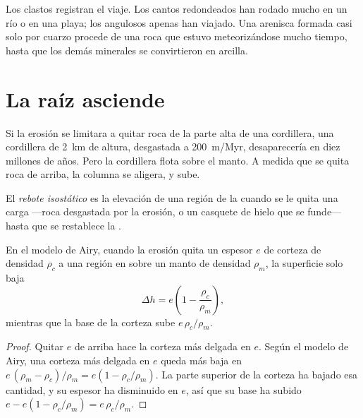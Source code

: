Los clastos registran el viaje. Los cantos redondeados han rodado mucho en un
río o en una playa; los angulosos apenas han viajado. Una arenisca formada
casi solo por cuarzo procede de una roca que estuvo meteorizándose mucho
tiempo, hasta que los demás minerales se convirtieron en arcilla.

\section{La raíz asciende}

Si la erosión se limitara a quitar roca de la parte alta de una cordillera,
una cordillera de \qty{2}{km} de altura, desgastada a \qty{200}{m/Myr},
desaparecería en diez millones de años. Pero la cordillera flota sobre el
manto. A medida que se quita roca de arriba, la columna se aligera, y sube.

\begin{definition}\label{def:g12:destruction-of-mountains:rebound}
El \emph{rebote isostático} es la
elevación de una región de la  cuando se le quita una carga ---roca
desgastada por la erosión, o un casquete de hielo que se funde--- hasta que se
restablece la .
\end{definition}

\begin{proposition}\label{prop:g12:destruction-of-mountains:rebound}
En el modelo de Airy, cuando la erosión quita un espesor $e$ de corteza de
densidad $\rho_c$ a una región en  sobre un manto de densidad
$\rho_m$, la superficie solo baja
\[
  \Delta h = e\left(1 - \frac{\rho_c}{\rho_m}\right),
\]
mientras que la base de la corteza sube $e\,\rho_c/\rho_m$.
\end{proposition}

\begin{proof}
Quitar $e$ de arriba hace la corteza más delgada en $e$. Según el modelo de
Airy, una corteza más delgada en $e$ queda más baja en $e\,(\rho_m - \rho_c)/\rho_m = e(1 -
\rho_c/\rho_m)$. La parte superior de la corteza ha bajado esa cantidad, y su
espesor ha disminuido en $e$, así que su base ha subido $e - e(1 -
\rho_c/\rho_m) = e\,\rho_c/\rho_m$.
\end{proof}

